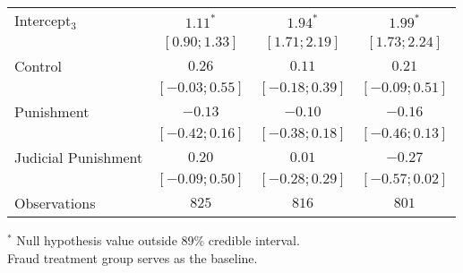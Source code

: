 \begin{table}[h]
\begin{center}
\begin{threeparttable}
\begin{tabular}{l c c c}
Intercept$_3$       & $1.11^{*}$        & $1.94^{*}$        & $1.99^{*}$        \\
                    & $ [ 0.90;  1.33]$ & $ [ 1.71;  2.19]$ & $ [ 1.73;  2.24]$ \\
Control             & $0.26$            & $0.11$            & $0.21$            \\
                    & $ [-0.03;  0.55]$ & $ [-0.18;  0.39]$ & $ [-0.09;  0.51]$ \\
Punishment          & $-0.13$           & $-0.10$           & $-0.16$           \\
                    & $ [-0.42;  0.16]$ & $ [-0.38;  0.18]$ & $ [-0.46;  0.13]$ \\
Judicial Punishment & $0.20$            & $0.01$            & $-0.27$           \\
                    & $ [-0.09;  0.50]$ & $ [-0.28;  0.29]$ & $ [-0.57;  0.02]$ \\
\hline
Observations        & $825$             & $816$             & $801$             \\
\hline
\end{tabular}
\begin{tablenotes}[flushleft]
\scriptsize{$^*$ Null hypothesis value outside 89\% credible interval.  \\
Fraud treatment group serves as the baseline.}
\end{tablenotes}
\end{threeparttable}
\label{table:ol_main_la_npol_847}
\end{center}
\end{table}
